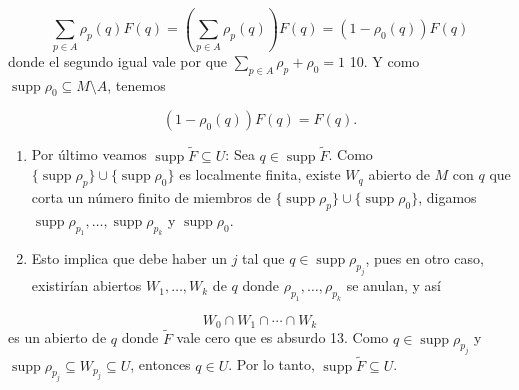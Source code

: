 \begin{bookproof}{}
\[
\sum_{p\in A}\rho_p(q)F(q)=\left(\sum_{p\in A}\rho_p(q)\right)F(q)=\left(1-\rho_0(q)\right)F(q)
\]
donde el segundo igual vale por que $\sum_{p\in A}\rho_{p}+\rho_{0}=1$ 10. Y como $\operatorname{supp}\rho_0\subseteq M\setminus A$, tenemos

\[
\left(1-\rho_0(q)\right)F(q)=F(q).
\]
\begin{enumerate}[start=11]
\item Por último veamos $\operatorname{supp}\widetilde{F}\subseteq U$: Sea $q\in\operatorname{supp}\widetilde{F}$. Como $\{\operatorname{supp}\rho_p\}\cup\{\operatorname{supp}\rho_0\}$ es localmente finita, existe $W_q$ abierto de $M$ con $q$ que corta un número finito de miembros de $\{\operatorname{supp}\rho_p\}\cup\{\operatorname{supp}\rho_0\}$, digamos $\operatorname{supp}\rho_{p_1},\ldots,\operatorname{supp}\rho_{p_k}$ y $\operatorname{supp}\rho_0$.
\item Esto implica que debe haber un $j$ tal que $q\in\operatorname{supp}\rho_{p_j}$, pues en otro caso, existirían abiertos $W_1,\ldots,W_k$ de $q$ donde $\rho_{p_1},\ldots,\rho_{p_k}$ se anulan, y así
\end{enumerate}
\[
W_0\cap W_1\cap\cdots\cap W_k
\]
es un abierto de $q$ donde $\widetilde{F}$ vale cero que es absurdo 13. Como $q\in\operatorname{supp}\rho_{p_j}$ y $\operatorname{supp}\rho_{p_j}\subseteq W_{p_j}\subseteq U$, entonces $q\in U$. Por lo tanto, $\operatorname{supp}\widetilde F\subseteq U$.

\bookqed
\end{bookproof}
